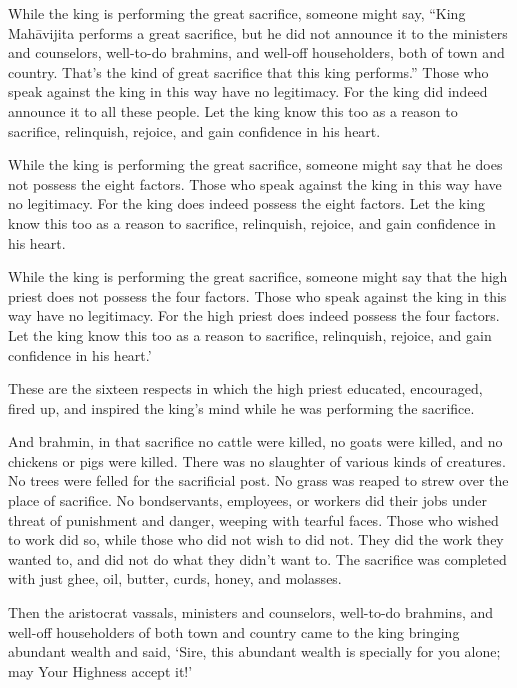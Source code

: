 \documentclass[12pt,openany]{book}%
\begin{document}
While the king is performing the great sacrifice, someone might say, “King \textsanskrit{Mahāvijita} performs a great sacrifice, but he did not announce it to the ministers and counselors, well-to-do brahmins, and well-off householders, both of town and country. That’s the kind of great sacrifice that this king performs.” Those who speak against the king in this way have no legitimacy. For the king did indeed announce it to all these people. Let the king know this too as a reason to sacrifice, relinquish, rejoice, and gain confidence in his heart. 

While the king is performing the great sacrifice, someone might say that he does not possess the eight factors. Those who speak against the king in this way have no legitimacy. For the king does indeed possess the eight factors. Let the king know this too as a reason to sacrifice, relinquish, rejoice, and gain confidence in his heart. 

While the king is performing the great sacrifice, someone might say that the high priest does not possess the four factors. Those who speak against the king in this way have no legitimacy. For the high priest does indeed possess the four factors. Let the king know this too as a reason to sacrifice, relinquish, rejoice, and gain confidence in his heart.’ 

These are the sixteen respects in which the high priest educated, encouraged, fired up, and inspired the king’s mind while he was performing the sacrifice. 

And brahmin, in that sacrifice no cattle were killed, no goats were killed, and no chickens or pigs were killed. There was no slaughter of various kinds of creatures. No trees were felled for the sacrificial post. No grass was reaped to strew over the place of sacrifice. No bondservants, employees, or workers did their jobs under threat of punishment and danger, weeping with tearful faces. Those who wished to work did so, while those who did not wish to did not. They did the work they wanted to, and did not do what they didn’t want to. The sacrifice was completed with just ghee, oil, butter, curds, honey, and molasses. 

Then the aristocrat vassals, ministers and counselors, well-to-do brahmins, and well-off householders of both town and country came to the king bringing abundant wealth and said, ‘Sire, this abundant wealth is specially for you alone; may Your Highness accept it!’ 
\end{document}
